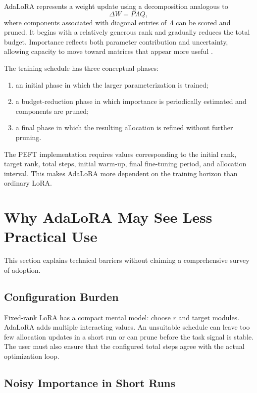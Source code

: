 AdaLoRA represents a weight update using a decomposition analogous to
\begin{equation}
  \Delta W = P\Lambda Q,
  \label{eq:adalora-decomp}
\end{equation}
where components associated with diagonal entries of $\Lambda$ can be scored and pruned.
It begins with a relatively generous rank and gradually reduces the total budget. Importance
reflects both parameter contribution and uncertainty, allowing capacity to move toward matrices
that appear more useful \citep{zhang2023adalora}.

The training schedule has three conceptual phases:
\begin{enumerate}
  \item an initial phase in which the larger parameterization is trained;
  \item a budget-reduction phase in which importance is periodically estimated and components are
  pruned;
  \item a final phase in which the resulting allocation is refined without further pruning.
\end{enumerate}

The PEFT implementation requires values corresponding to the initial rank, target rank, total
steps, initial warm-up, final fine-tuning period, and allocation interval. This makes AdaLoRA more
dependent on the training horizon than ordinary LoRA.

\section{Why AdaLoRA May See Less Practical Use}

This section explains technical barriers without claiming a comprehensive survey of adoption.

\subsection{Configuration Burden}

Fixed-rank LoRA has a compact mental model: choose $r$ and target modules. AdaLoRA adds multiple
interacting values. An unsuitable schedule can leave too few allocation updates in a short run or
can prune before the task signal is stable. The user must also ensure that the configured total
steps agree with the actual optimization loop.

\subsection{Noisy Importance in Short Runs}

